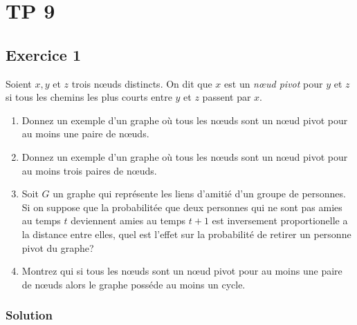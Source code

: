 \section{TP 9}


\subsection*{Exercice 1}
Soient $x, y$ et $z$ trois n\oe{}uds distincts. On dit que $x$ est un \emph{n\oe{}ud pivot} pour $y$ et $z$ si tous les chemins les plus courts entre $y$ et $z$ passent par $x$.

\begin{enumerate}
\item Donnez un exemple d'un graphe o\`{u} tous les n\oe{}uds sont un n\oe{}ud pivot pour au moins une paire de n\oe{}uds.
\item Donnez un exemple d'un graphe o\`{u} tous les n\oe{}uds sont un n\oe{}ud pivot pour au moins trois paires de n\oe{}uds.
\item Soit $G$ un graphe qui repr\'{e}sente les liens d'amiti\'{e} d'un groupe de personnes. Si on suppose que la probabilit\'{e}e que deux personnes qui ne sont pas amies au 
temps $t$ deviennent amies au temps $t + 1$ est inversement proportionelle a la distance entre elles, quel est l'effet sur la probabilit\'{e} de retirer un personne pivot du graphe? 
\item Montrez qui si tous les n\oe{}uds sont un n\oe{}ud pivot pour au moins une paire de n\oe{}uds alors le graphe poss\'{e}de au moins un cycle.
\end{enumerate}

\subsubsection*{Solution}


